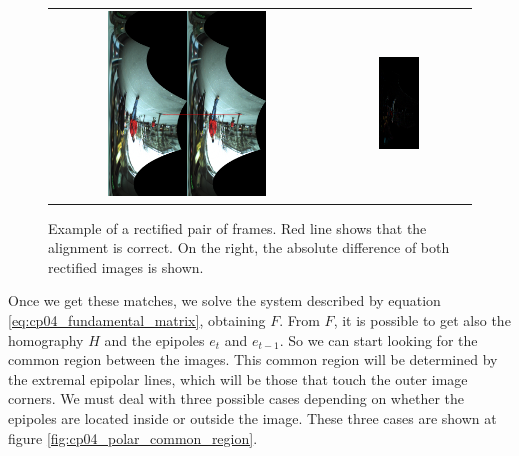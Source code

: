 \begin{figure}[p]
    \centering
    \begin{tabular}{ cc }
      \includegraphics[width=0.6\textwidth]{polarRectification}\label{fig:cp04_polarRectification} &
      \includegraphics[width=0.3\textwidth]{polarDiff}\label{fig:cp04_polarDiff}
    \end{tabular}
  \caption{Example of a rectified pair of frames. Red line shows that the alignment is correct. On the right, the absolute difference of both rectified images is shown.}\label{fig:cp04_polarRectification_example}
\end{figure}

Once we get these matches, we solve the system described by equation \ref{eq:cp04_fundamental_matrix}, obtaining $F$. From $F$, it is possible to get also the homography $H$ and the epipoles $e_t$ and $e_{t-1}$. So we can start looking for the common region between the images. This common region will be determined by the extremal epipolar lines, which will be those that touch the outer image corners. We must deal with three possible cases depending on
whether the epipoles are located inside or outside the image. These three cases are shown at figure \ref{fig:cp04_polar_common_region}.

